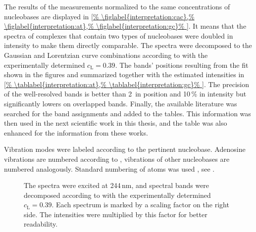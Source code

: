 The results of the measurements normalized to the same concentrations of
nucleobases are displayed in
\cref{%
	\figlabel{interpretation:cac},%
	\figlabel{interpretation:at},%
	\figlabel{interpretation:gc}%
}.
It means that the spectra of complexes that contain two types of nucleobases
were doubled in intensity to make them directly comparable.
The spectra were decomposed to the Gaussian and Lorentzian curve combinations
according to
with the experimentally determined
$c_\text{L} = 0.39$.
The bands' positions resulting from the fit shown in the figures
and summarized together with the estimated intensities in
\cref{%
	\tablabel{interpretation:at},%
	\tablabel{interpretation:gc}%
}.
The precision of the well-resolved bands is better than 2\,\icm{} in position
and 10\,\% in intensity but significantly lowers on overlapped bands.
Finally, the available literature was searched for the band assignments and
added to the tables.
This information was then used in the next scientific work in this thesis, and
the table was also enhanced for the information from these works.

Vibration modes were labeled according to the pertinent nucleobase.
Adenosine vibrations are numbered according to
\textcite{Toyama1994},
vibrations of other nucleobases are numbered analogously.
Standard numbering of atoms was used
\parencite{Bloomfield1999},
see
.

\begin{figure}
	\centering
	
	\caption[%
		Nucleoside standard atom numbering and Watson-Crick hydrogen bonding.
	]{%
		}
	\label{\figlabel{interpretation:structure}}
\end{figure}

\begin{figure}
	\centering
	
	\caption[%
		Spectrum of cacodylate solvent used for background subtraction with
		244\,nm excitation.
	]{%
		}
	\label{\figlabel{interpretation:cac}}
\end{figure}

\begin{figure}
	\centering
	
	\caption[%
		Spectra of AMP, TMP and poly(dAdT) obtained at 5\,\textdegree{}C and
		95\,\textdegree{}C.
	]{%
		The spectra were excited at 244\,nm, and spectral bands were decomposed
		according to
		with the experimentally determined
		$c_\text{L} = 0.39$.
		Each spectrum is marked by a scaling factor on the right side.
		The intensities were multiplied by this factor for better readability.}
	\label{\figlabel{interpretation:at}}
\end{figure}

